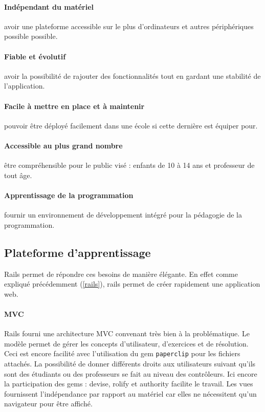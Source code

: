\paragraph{Indépendant du matériel} avoir une plateforme accessible sur le plus d'ordinateurs et autres périphériques possible possible.
\paragraph{Fiable et évolutif} avoir la possibilité de rajouter des fonctionnalités tout en gardant une stabilité de l'application.
\paragraph{Facile à mettre en place et à maintenir} pouvoir être déployé facilement dans une école si cette dernière est équiper pour.
\paragraph{Accessible au plus grand nombre} être compréhensible pour le public visé : enfants de 10 à 14 ans et professeur de tout âge.
\paragraph{Apprentissage de la programmation} fournir un environnement de développement intégré pour la pédagogie de la programmation.

\subsection{Plateforme d'apprentissage}
Rails permet de répondre ces besoins de manière élégante. En effet comme expliqué précédemment (\ref{rails}), rails permet de créer rapidement une application web.

\paragraph{MVC} Rails fourni une architecture MVC convenant très bien à la problématique. Le modèle permet de gérer les concepts d'utilisateur, d'exercices et de résolution. Ceci est encore facilité avec l'utilisation du gem \texttt{paperclip} pour les fichiers attachés.  La possibilité de donner différents droits aux utilisateurs suivant qu'ils sont des étudiants ou des professeurs se fait au niveau des contrôleurs. Ici encore la participation des gems : devise, rolify et authority facilite le travail. Les vues fournissent l'indépendance par rapport au matériel car elles ne nécessitent qu'un navigateur pour être affiché.

